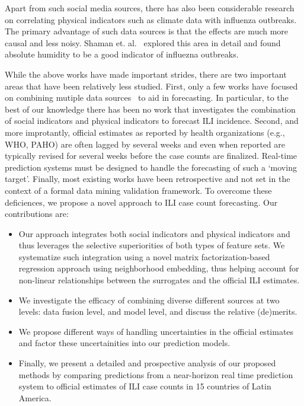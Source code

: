 Apart from such social media sources,
there has also been considerable research on 
correlating physical indicators such as climate data with influenza outbreaks. 
The primary advantage of such data sources is that the
effects are much more causal and less noisy. 
Shaman et. al.~\cite{ref9, Shaman_orig_humidity_link, Shaman_humidity_USA} 
explored this area in detail and found absolute humidity 
to be a good indicator of influezna outbreaks.

While the above works have made important strides, there are two important areas that
have been relatively less studied. First, 
only a few works have focused on combining mutiple data sources~\cite{ref10, ref3}
to aid in forecasting. In particular, to the best of our knowledge there has been no work
that investigates the combination of social indicators and physical indicators to forecast
ILI incidence. Second, and more improtantly, official estimates as reported by health
organizations (e.g., WHO, PAHO) are often lagged by several weeks and
even when reported are typically revised for several weeks before the case counts are
finalized. Real-time prediction systems must be designed to handle the forecasting of
such a `moving target'. Finally, most existing works have been retrospective and not set in
the context of a formal data mining validation framework. To overcome these deficiences, we
propose a novel approach to ILI case count forecasting. Our contributions are:
\begin{itemize}
  \item Our approach integrates both social indicators and physical indicators and thus
leverages the selective superiorities of both types of feature sets. We systematize such
integration using a novel matrix factorization-based regression approach
using neighborhood embedding, thus helping account for 
non-linear relationships between the surrogates and the official ILI estimates.
  \item We investigate the efficacy of combining diverse different sources at two
levels: data fusion level, and model level, and discuss the relative (de)merits.
  \item We propose different ways of handling uncertainties in the official 
    estimates and factor these uncertainities into our prediction models.
  \item Finally, we present a detailed and prospective analysis of our proposed methods
    by comparing predictions from a near-horizon real time prediction system to 
    official estimates of ILI case counts in 15 countries of Latin America.
\end{itemize}

